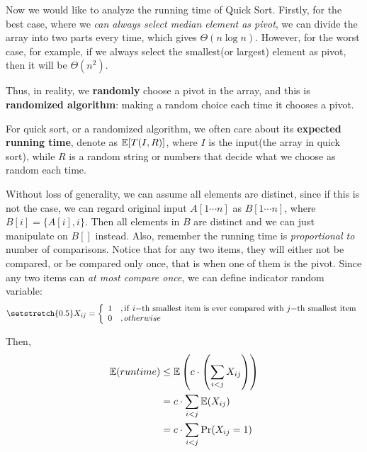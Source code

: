 \begin{spacing}{1.3}
    Now we would like to analyze the running time of Quick Sort.
    Firstly, for the best case, where we {\it can always 
    select median element as pivot}, we can divide the array 
    into two parts every time, which gives $\Theta(n\log n)$.
    However, for the worst case, for example, if we always select 
    the smallest(or largest) element as pivot, then 
    it will be $\Theta(n^2)$.

    Thus, in reality, we {\bf randomly} choose a pivot in the 
    array, and this is {\bf randomized algorithm}: making 
    a random choice each time it chooses a pivot.

    For quick sort, or a randomized algorithm, we often care about 
    its {\bf expected running time}, denote as $\mathbb{E}[T(I,R)]$, 
    where $I$ is the input(the array in quick sort), while $R$ is 
    a random string or numbers that decide what we choose as 
    random each time.

    Without loss of generality, we can assume all elements are 
    distinct, since if this is not the case, we can regard 
    original input $A[1\cdots n]$ as $B[1\cdots n]$, where 
    $B[i]=\{A[i], i\}$. Then all elements in $B$ are distinct 
    and we can just manipulate on $B[]$ instead. 
    Also, remember the running time is {\it proportional to}
    number of comparisons. Notice that for any two items, 
    they will either not be compared, or be compared only once,
    that is when one of them is the pivot.
    Since any two items can {\it at most compare once},
    we can define indicator random variable: 
    \begin{align*}
        \setstretch{0.5}
        X_{ij}=\left\{ 
            \begin{array}{ll}
                1 &, {\rm if\ } i{\rm -th\ smallest\ item\ is\ ever\ compared 
                \ with\ }j{\rm -th\ smallest\ item}\\
                0 &, otherwise
            \end{array}
        \right.
    \end{align*}

    Then,
    \begin{align*}
        \mathbb{E}(runtime)&\le \mathbb{E}\left(c\cdot \left(\sum_{i<j}X_{ij}\right)\right)\\
        &=c\cdot \sum_{i<j} \mathbb{E}(X_{ij})\\
        &=c\cdot \sum_{i<j} \Pr(X_{ij}=1)
    \end{align*}
    

\end{spacing}
